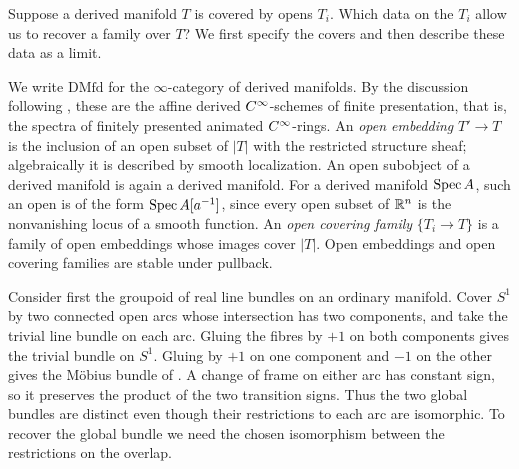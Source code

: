 Suppose a derived manifold $T$ is covered by opens $T_i$. Which data
on the $T_i$ allow us to recover a family over $T$? We first specify
the covers and then describe these data as a limit.

We write $\mathrm{DMfd}$ for the $\infty$-category of derived manifolds. By the discussion following
, these are the affine derived
$C^\infty$-schemes of finite presentation, that is, the spectra of
finitely presented animated $C^\infty$-rings. An \emph{open embedding}
$T'\to T$ is the inclusion of an open subset of $|T|$ with the restricted
structure sheaf; algebraically it is described by smooth localization.
An open subobject of a derived manifold is again a derived manifold.
For a derived manifold $\operatorname{Spec} A$, such an open is of the form
$\operatorname{Spec} A[a^{-1}]$, since every open subset of $\mathbb{R}^n$ is the nonvanishing
locus of a smooth function. An \emph{open covering family}
$\{T_i\to T\}$ is a family of open embeddings whose images cover $|T|$.
Open embeddings and open covering families are stable under pullback.



Consider first the groupoid of real line bundles on an ordinary
manifold. Cover $S^1$ by two connected open arcs whose intersection has
two components, and take the trivial line bundle on each arc. Gluing
the fibres by $+1$ on both components gives the trivial bundle on $S^1$.
Gluing by $+1$ on one component and $-1$ on the other gives the
M\"obius bundle of .
A change of frame on either arc has constant sign, so it preserves the
product of the two transition signs. Thus the two global bundles are
distinct even though their restrictions to each arc are isomorphic.
To recover the global bundle we need the chosen isomorphism between
the restrictions on the overlap.

